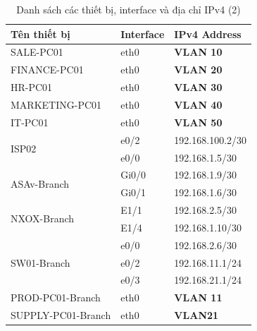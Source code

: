 \documentclass[13pt]{article}
\renewcommand{\thesubsection}{\thesection.\arabic{subsection}} %
\begin{document}
\begin{enumerate}
\newpage
\begin{table}[h!]
    \centering
    \begin{tabular}{|p{4cm}|p{2cm}|p{5cm}|}
        \hline
        \textbf{Tên thiết bị} & \textbf{Interface} & \textbf{IPv4 Address} \\ \hline
        SALE-PC01 & eth0 & \textbf{VLAN 10}\\
        \hline
        FINANCE-PC01 & eth0 & \textbf{VLAN 20}\\
        \hline
        HR-PC01 & eth0 & \textbf{VLAN 30}\\
        \hline
        MARKETING-PC01 & eth0 & \textbf{VLAN 40}\\
        \hline
        IT-PC01 & eth0 & \textbf{VLAN 50}\\
        \hline
        \multirow{2}{*}{ISP02} & e0/2 & 192.168.100.2/30 \\ \cline{2-3}
                                & e0/0 & 192.168.1.5/30 \\ \hline
        \multirow{2}{*}{ASAv-Branch} & Gi0/0 & 192.168.1.9/30 \\ \cline{2-3}
                                & Gi0/1 & 192.168.1.6/30 \\ \hline
        \multirow{2}{*}{NXOX-Branch} & E1/1 & 192.168.2.5/30 \\ \cline{2-3}
                                & E1/4 & 192.168.1.10/30 \\ \hline
        \multirow{3}{*}{SW01-Branch} & e0/0 & 192.168.2.6/30 \\ \cline{2-3}
                                & e0/2 & 192.168.11.1/24 \\ \cline{2-3}
                                & e0/3 & 192.168.21.1/24 \\ \hline
        PROD-PC01-Branch & eth0 & \textbf{VLAN 11}\\
        \hline
        SUPPLY-PC01-Branch & eth0 & \textbf{VLAN21}\\
        \hline
    \end{tabular}
    \caption{Danh sách các thiết bị, interface và địa chỉ IPv4 (2)}
    \label{table:ipv4}
\end{table}
\end{enumerate}


\newpage
\renewcommand{\thesubsection}{\thesection.\arabic{subsection}} %
\setcounter{section}{4} %
\setcounter{subsection}{0}

\end{document}
